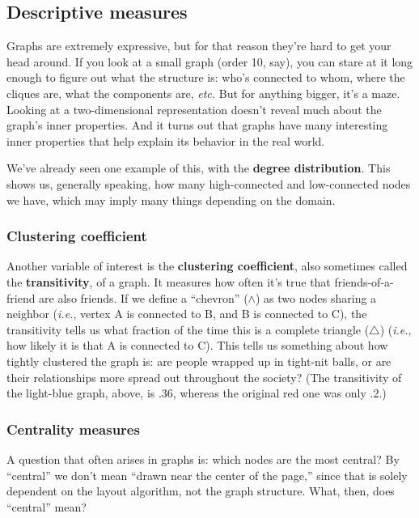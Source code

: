 \subsection{Descriptive measures}

Graphs are extremely expressive, but for that reason they're hard to get your
head around. If you look at a small graph (order 10, say), you can stare at it
long enough to figure out what the structure is: who's connected to whom,
where the cliques are, what the components are, \textit{etc.} But for anything
bigger, it's a maze. Looking at a two-dimensional representation doesn't
reveal much about the graph's inner properties. And it turns out that graphs
have many interesting inner properties that help explain its behavior in the
real world.

We've already seen one example of this, with the \textbf{degree distribution}.
This shows us, generally speaking, how many high-connected and low-connected
nodes we have, which may imply many things depending on the domain.

\subsubsection{Clustering coefficient}

Another variable of interest is the \textbf{clustering coefficient}, also
sometimes called the \textbf{transitivity}, of a graph. It measures how often
it's true that friends-of-a-friend are also friends. If we define a
``chevron''
($\wedge$) as two nodes sharing a neighbor (\textit{i.e.}, vertex A is
connected to B, and B is connected to C), the transitivity tells us what
fraction of the time this is a complete triangle ($\triangle$) (\textit{i.e.},
how likely it is that A is connected to C). This tells us something about how
tightly clustered the graph is: are people wrapped up in tight-nit balls, or
are their relationships more spread out throughout the society? (The
transitivity of the light-blue graph, above, is .36, whereas the original red
one was only .2.)

\subsubsection{Centrality measures}

A question that often arises in graphs is: which nodes are the most central?
By ``central'' we don't mean ``drawn near the center of the page,'' since that
is solely dependent on the layout algorithm, not the graph structure. What,
then, does ``central'' mean?

